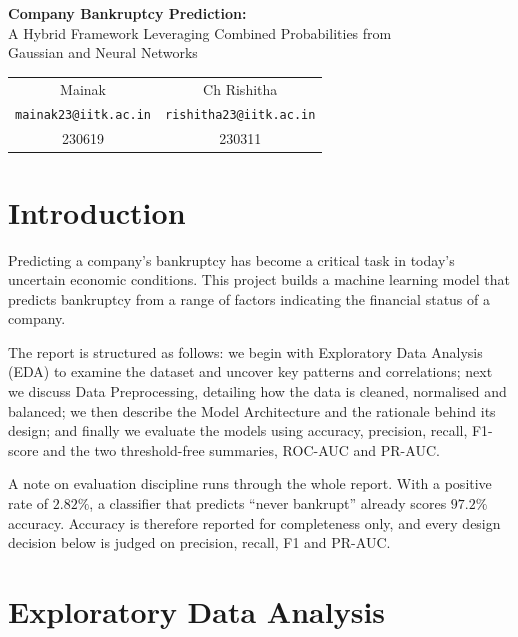 \documentclass[11pt]{article}
\begin{document}
\begin{center}
    {\Large\textbf{Company Bankruptcy Prediction:}}\\[2pt]
    {\large A Hybrid Framework Leveraging Combined Probabilities from}\\
    {\large Gaussian and Neural Networks}\\[10pt]

    \begin{tabular}{cc}
        Mainak & Ch Rishitha \\
        \texttt{\small mainak23@iitk.ac.in} & \texttt{\small rishitha23@iitk.ac.in} \\
        230619 & 230311
    \end{tabular}
\end{center}
\vspace{6pt}

\section{Introduction}

Predicting a company's bankruptcy has become a critical task in today's
uncertain economic conditions. This project builds a machine learning model
that predicts bankruptcy from a range of factors indicating the financial
status of a company.

The report is structured as follows: we begin with Exploratory Data Analysis
(EDA) to examine the dataset and uncover key patterns and correlations; next we
discuss Data Preprocessing, detailing how the data is cleaned, normalised and
balanced; we then describe the Model Architecture and the rationale behind its
design; and finally we evaluate the models using accuracy, precision, recall,
F1-score and the two threshold-free summaries, ROC-AUC and PR-AUC.

A note on evaluation discipline runs through the whole report. With a positive
rate of $2.82\%$, a classifier that predicts ``never bankrupt'' already scores
$97.2\%$ accuracy. Accuracy is therefore reported for completeness only, and
every design decision below is judged on precision, recall, F1 and PR-AUC.

\section{Exploratory Data Analysis}
\end{document}
